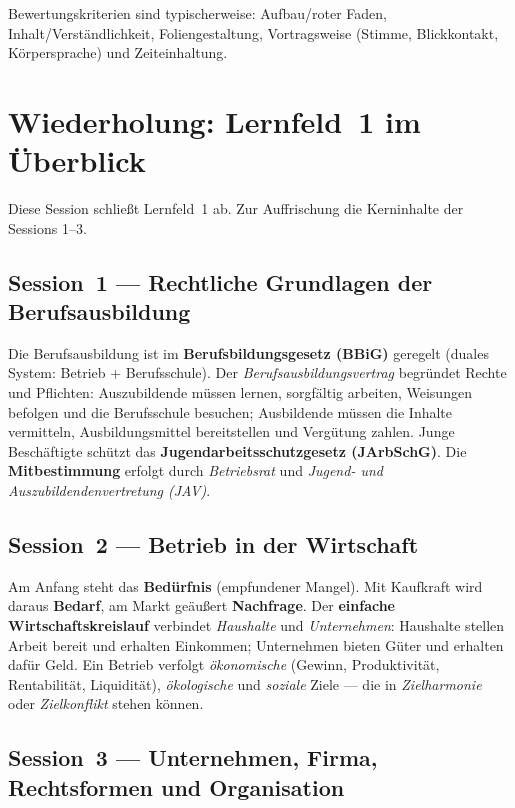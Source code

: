 \documentclass[11pt, a4paper]{article}
\begin{document}
Bewertungskriterien sind typischerweise: Aufbau/roter Faden, Inhalt/Verständlichkeit,
Foliengestaltung, Vortragsweise (Stimme, Blickkontakt, Körpersprache) und Zeiteinhaltung.

\section{Wiederholung: Lernfeld~1 im Überblick}

Diese Session schließt Lernfeld~1 ab. Zur Auffrischung die Kerninhalte der Sessions 1--3.

\subsection{Session~1 --- Rechtliche Grundlagen der Berufsausbildung}

Die Berufsausbildung ist im \textbf{Berufsbildungsgesetz (BBiG)} geregelt (duales System:
Betrieb + Berufsschule). Der \emph{Berufsausbildungsvertrag} begründet Rechte und
Pflichten: Auszubildende müssen lernen, sorgfältig arbeiten, Weisungen befolgen und die
Berufsschule besuchen; Ausbildende müssen die Inhalte vermitteln, Ausbildungsmittel
bereitstellen und Vergütung zahlen. Junge Beschäftigte schützt das
\textbf{Jugendarbeitsschutzgesetz (JArbSchG)}. Die \textbf{Mitbestimmung} erfolgt durch
\emph{Betriebsrat} und \emph{Jugend- und Auszubildendenvertretung (JAV)}.

\subsection{Session~2 --- Betrieb in der Wirtschaft}

Am Anfang steht das \textbf{Bedürfnis} (empfundener Mangel). Mit Kaufkraft wird daraus
\textbf{Bedarf}, am Markt geäußert \textbf{Nachfrage}. Der \textbf{einfache
Wirtschaftskreislauf} verbindet \emph{Haushalte} und \emph{Unternehmen}: Haushalte stellen
Arbeit bereit und erhalten Einkommen; Unternehmen bieten Güter und erhalten dafür Geld.
Ein Betrieb verfolgt \emph{ökonomische} (Gewinn, Produktivität, Rentabilität, Liquidität),
\emph{ökologische} und \emph{soziale} Ziele --- die in \emph{Zielharmonie} oder
\emph{Zielkonflikt} stehen können.

\subsection{Session~3 --- Unternehmen, Firma, Rechtsformen und Organisation}
\end{document}
